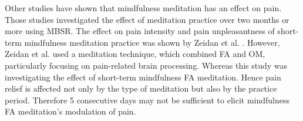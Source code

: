 Other studies have shown that mindfulness meditation has an effect on pain. Those studies investigated the effect of meditation practice over two months or more using MBSR. \cite{Kabat1982,Rosenzweig2010} The effect on pain intensity and pain unpleasantness of short-term mindfulness meditation practice was shown by Zeidan et al. \cite{Zeidan2012}. However, Zeidan et al. \cite{Zeidan2012} used a meditation technique, which combined FA and OM, particularly focusing on pain-related brain processing. Whereas this study was investigating the effect of short-term mindfulness FA meditation. Hence pain relief is affected not only by the type of meditation but also by the practice period. Therefore 5 consecutive days may not be sufficient to elicit mindfulness FA meditation’s modulation of pain.



